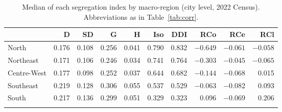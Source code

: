 \begin{table}[h]
\caption{Median of each segregation index by macro-region (city level, 2022 Census). Abbreviations as in Table~\ref{tab:corr}.}\label{tab:regional}%
\footnotesize
\setlength{\tabcolsep}{4.5pt}
\begin{tabular}{@{}lrrrrrrrrr@{}}
\toprule
 & D & SD & G & H & Iso & DDI & RCo & RCe & RCl \\
\midrule
North       & 0.176 & 0.108 & 0.256 & 0.041 & 0.790 & 0.832 & $-0.649$ & $-0.061$ & $-0.058$ \\
Northeast   & 0.171 & 0.106 & 0.246 & 0.034 & 0.741 & 0.764 & $-0.303$ & $-0.045$ & $-0.065$ \\
Centre-West & 0.177 & 0.098 & 0.252 & 0.037 & 0.644 & 0.682 & $-0.144$ & $-0.068$ & 0.015 \\
Southeast   & 0.219 & 0.128 & 0.306 & 0.055 & 0.537 & 0.529 & $-0.063$ & $-0.082$ & 0.093 \\
South       & 0.217 & 0.136 & 0.299 & 0.051 & 0.329 & 0.323 & 0.096 & $-0.069$ & 0.206 \\
\botrule
\end{tabular}
\end{table}
